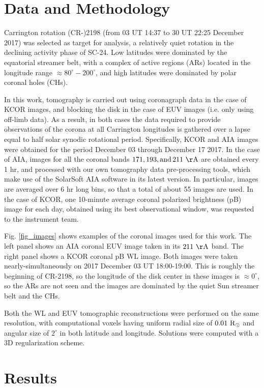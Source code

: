 \documentclass[baaa]{baaa}
\begin{document}
\section{Data and Methodology}\label{method}

Carrington rotation (CR-)2198 {(from 03 UT 14:37 to 30 UT 22:25 December 2017)} was selected as target for analysis, a relatively quiet rotation in the declining activity phase of SC-24. Low latitudes were dominated by the equatorial streamer belt, with a complex of active regions (ARs) located in the longitude range $\approx 80^\circ-200^\circ$, and high latitudes were dominated by polar coronal holes (CHs).  

{In this work, tomography is carried out using coronagraph data in the case of KCOR images, and blocking the disk in the case of EUV images (i.e. only using off-limb data). As a result, in both cases the data  required to provide observations of the corona at all Carrington longitudes is gathered over a lapse equal to half solar synodic rotational period. Specifically,  KCOR and AIA images were obtained for the period December 03 through December 17 2017.} In the case of AIA, images for all the coronal bands $171, 193, \rm{and}\, 211~\AA$ are obtained every 1 hr, and processed with our own tomography data pre-processing tools, which make use of the SolarSoft AIA software in its latest version. In particular, images are averaged over 6 hr long bins, so that a total of about 55 images are used. In the case of KCOR, one 10-minute average coronal polarized brightness (pB) image for each day, obtained using its best observational window, was requested to the instrument team.

Fig. \ref{fig_images} shows examples of the coronal images used for this work. The left panel shows an AIA coronal EUV image taken in its $211~\rm{\AA}$ band. The right panel shows a KCOR coronal pB WL image. Both images were taken nearly-simultaneously on 2017 December 03 UT 18:00-19:00. This is roughly the beginning of CR-2198, so the longitude of the disk center in these images is $\approx 0^\circ$, so the ARs are not seen and the images are dominated by the quiet {Sun} streamer belt and the CHs.

Both the WL and EUV tomographic reconstructions were performed on the same resolution, with computational voxels having uniform radial size of $0.01~\rm{R}_\odot$ and angular size of $2^\circ$ in both latitude and longitude. Solutions were computed with a 3D regularization scheme.

\section{Results}
\end{document}
